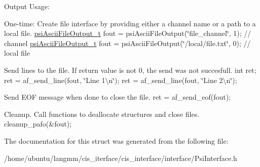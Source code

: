 Output Usage\+:
\begin{DoxyEnumerate}
\item One-\/time\+: Create file interface by providing either a channel name or a path to a local file. \hyperlink{structpsiAsciiFileOutput__t}{psi\+Ascii\+File\+Output\+\_\+t} fout = psi\+Ascii\+File\+Output(\char`\"{}file\+\_\+channel\char`\"{}, 1); // channel \hyperlink{structpsiAsciiFileOutput__t}{psi\+Ascii\+File\+Output\+\_\+t} fout = psi\+Ascii\+File\+Output(\char`\"{}/local/file.\+txt\char`\"{}, 0); // local file
\item Send lines to the file. If return value is not 0, the send was not succesfull. int ret; ret = af\+\_\+send\+\_\+line(fout, \char`\"{}\+Line 1\textbackslash{}n\char`\"{}); ret = af\+\_\+send\+\_\+line(fout, \char`\"{}\+Line 2\textbackslash{}n\char`\"{});
\item Send E\+OF message when done to close the file. ret = af\+\_\+send\+\_\+eof(fout);
\item Cleanup. Call functions to deallocate structures and close files. cleanup\+\_\+pafo(\&fout); 
\end{DoxyEnumerate}

The documentation for this struct was generated from the following file\+:\begin{DoxyCompactItemize}
\item 
/home/ubuntu/langmm/cis\+\_\+iterface/cis\+\_\+interface/interface/Psi\+Interface.\+h\end{DoxyCompactItemize}
